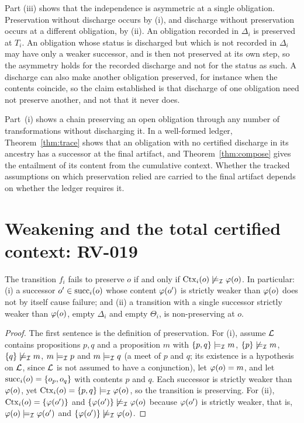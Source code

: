 Part (iii) shows that the independence is asymmetric at a single obligation. Preservation without discharge occurs by (i), and discharge without preservation occurs at a different obligation, by (ii). An obligation recorded in $\Delta_i$ is preserved at $T_i$. An obligation whose status is discharged but which is not recorded in $\Delta_i$ may have only a weaker successor, and is then not preserved at its own step, so the asymmetry holds for the recorded discharge and not for the status as such. A discharge can also make another obligation preserved, for instance when the contents coincide, so the claim established is that discharge of one obligation need not preserve another, and not that it never does.

\begin{corollary}
Part~(i) shows a chain preserving an open obligation through any number of transformations without discharging it. In a well-formed ledger, Theorem~\ref{thm:trace} shows that an obligation with no certified discharge in its ancestry has a successor at the final artifact, and Theorem~\ref{thm:compose} gives the entailment of its content from the cumulative context. Whether the tracked assumptions on which preservation relied are carried to the final artifact depends on whether the ledger requires it.
\end{corollary}

\section{Weakening and the total certified context: RV-019}

\begin{proposition}
\label{prop:weak}
The transition $f_i$ fails to preserve $o$ if and only if $\operatorname{Ctx}_i(o) \not\models_{\mathcal{I}} \varphi(o)$. In particular: (i) a successor $o' \in \operatorname{succ}_i(o)$ whose content $\varphi(o')$ is strictly weaker than $\varphi(o)$ does not by itself cause failure; and (ii) a transition with a single successor strictly weaker than $\varphi(o)$, empty $\Delta_i$ and empty $\Theta_i$, is non-preserving at $o$.
\end{proposition}

\begin{proof}
The first sentence is the definition of preservation. For (i), assume $\mathcal{L}$ contains propositions $p,q$ and a proposition $m$ with $\{p,q\} \models_{\mathcal{I}} m$, $\{p\} \not\models_{\mathcal{I}} m$, $\{q\} \not\models_{\mathcal{I}} m$, $m \models_{\mathcal{I}} p$ and $m \models_{\mathcal{I}} q$ (a meet of $p$ and $q$; its existence is a hypothesis on $\mathcal{L}$, since $\mathcal{L}$ is not assumed to have a conjunction), let $\varphi(o)=m$, and let $\operatorname{succ}_i(o) = \{o_p, o_q\}$ with contents $p$ and $q$. Each successor is strictly weaker than $\varphi(o)$, yet $\operatorname{Ctx}_i(o) = \{p,q\} \models_{\mathcal{I}} \varphi(o)$, so the transition is preserving. For (ii), $\operatorname{Ctx}_i(o) = \{\varphi(o')\}$ and $\{\varphi(o')\} \not\models_{\mathcal{I}} \varphi(o)$ because $\varphi(o')$ is strictly weaker, that is, $\varphi(o) \models_{\mathcal{I}} \varphi(o')$ and $\{\varphi(o')\} \not\models_{\mathcal{I}} \varphi(o)$.
\end{proof}

